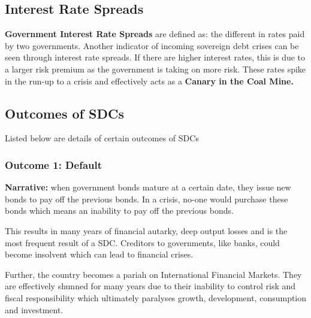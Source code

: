 \documentclass[12pt, letterpaper]{article}
\begin{document}
\subsection{Interest Rate Spreads}
\textbf{Government Interest Rate Spreads} are defined as: the different in rates paid by two governments. Another indicator of incoming sovereign debt crises can be seen through interest rate spreads. If there are higher interest rates, this is due to a larger risk premium as the government is taking on more risk. These rates spike in the run-up to a crisis and effectively acts as a \textbf{Canary in the Coal Mine.}

\subsection{Outcomes of SDCs}
Listed below are details of certain outcomes of SDCs
\subsubsection{Outcome 1: Default}
\textbf{Narrative:} when government bonds mature at a certain date, they issue new bonds to pay off the previous bonds. In a crisis, no-one would purchase these bonds which means an inability to pay off the previous bonds.

This results in many years of financial autarky, deep output losses and is the most frequent result of a SDC. Creditors to governments, like banks, could become insolvent which can lead to financial crises. 

Further, the country becomes a pariah on International Financial Markets. They are effectively shunned for many years due to their inability to control risk and fiscal responsibility which ultimately paralyses growth, development, consumption and investment.
\end{document}
